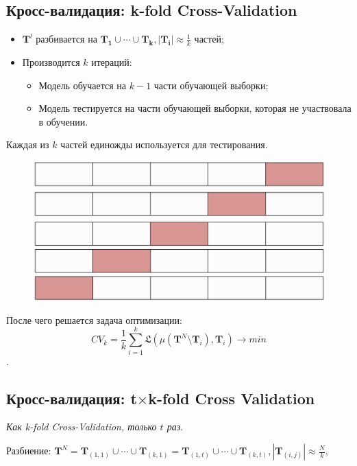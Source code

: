 \documentclass[11pt, oneside]{article}   	%
\begin{document}
\subsection{Кросс-валидация: k-fold Cross-Validation}
\begin{itemize}
	\item $\bm{T}^l$ разбивается на $ \bm{T_1}\cup\cdots\cup\bm{T_k}, |\bm{T_i}|\approx \frac{1}{k} $ частей;
	\item Производится $ k $ итераций:
	\begin{itemize}
		\item Модель обучается на $ k-1 $ части обучающей выборки;
		\item Модель тестируется на части обучающей выборки, которая не участвовала в обучении.
	\end{itemize}
\end{itemize}
Каждая из $ k $ частей единожды используется для тестирования.

\begin{figure}[h]
	\includegraphics[width=1\linewidth]{imgs/K-fold-validation}
\end{figure}
После чего решается задача оптимизации:
$$ CV_k = \frac{1}{k}\sum\limits_{i=1}^k\mathfrak{L}(\mu(\bm{T}^N \setminus \bm{T}_i), \bm{T}_i) \rightarrow min $$.


\subsection{Кросс-валидация: t$\times$k-fold Cross Validation}
\begin{center}
	\textit{Как k-fold Cross-Validation, только $t$ раз.}
\end{center}

Разбиение:
$\bm{T}^N = \bm{T}_{(1,1)}\cup\cdots\cup\bm{T}_{(k,1)}=\bm{T}_{(1,t)}\cup\cdots\cup\bm{T}_{(k,t)},|\bm{T}_{(i,j)}|\approx \frac{N}{k} $, 
\end{document}
